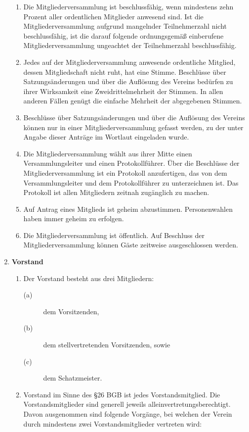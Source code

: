 \begin{enumerate}[label=\bfseries §\arabic*]
\begin{enumerate}[label=\bfseries (\arabic*)]
      \item Die Mitgliederversammlung ist beschlussfähig, wenn mindestens zehn Prozent aller ordentlichen Mitglieder anwesend sind. Ist die Mitgliederversammlung aufgrund mangelnder Teilnehmerzahl nicht beschlussfähig, ist die darauf folgende ordnungsgemäß einberufene Mitgliederversammlung ungeachtet der Teilnehmerzahl beschlussfähig.
      \item Jedes auf der Mitgliederversammlung anwesende ordentliche Mitglied, dessen Mitgliedschaft nicht ruht, hat eine Stimme. Beschlüsse über Satzungsänderungen und über die Auflösung des Vereins bedürfen zu ihrer Wirksamkeit eine Zweidrittelmehrheit der Stimmen. In allen anderen Fällen genügt die einfache Mehrheit der abgegebenen Stimmen.
      \item Beschlüsse über Satzungsänderungen und über die Auflösung des Vereins können nur in einer Mitgliederversammlung gefasst werden, zu der unter Angabe dieser Anträge im Wortlaut eingeladen wurde.
      \item Die Mitgliederversammlung wählt aus ihrer Mitte einen Versammlungsleiter und einen Protokollführer. Über die Beschlüsse der Mitgliederversammlung ist ein Protokoll anzufertigen, das von dem Versammlungsleiter und dem Protokollführer zu unterzeichnen ist. Das Protokoll ist allen Mitgliedern zeitnah zugänglich zu machen.
      \item Auf Antrag eines Mitglieds ist geheim abzustimmen. Personenwahlen haben immer geheim zu erfolgen.
      \item Die Mitgliederversammlung ist öffentlich. Auf Beschluss der Mitgliederversammlung können Gäste zeitweise ausgeschlossen werden.
    \end{enumerate}
  \item \textbf{Vorstand}
    \begin{enumerate}[label=\bfseries (\arabic*)]
      \item Der Vorstand besteht aus drei Mitgliedern:
        \begin{description}
          \item[(a)] dem Vorsitzenden,
          \item[(b)] dem stellvertretenden Vorsitzenden, sowie
          \item[(c)] dem Schatzmeister.
        \end{description}
      \item Vorstand im Sinne des §26 BGB ist jedes Vorstandsmitglied. Die Vorstandsmitglieder sind generell jeweils alleinvertretungsberechtigt. Davon ausgenommen sind folgende Vorgänge, bei welchen der Verein durch mindestens zwei Vorstandsmitglieder vertreten wird:

\end{enumerate}
\end{enumerate}
